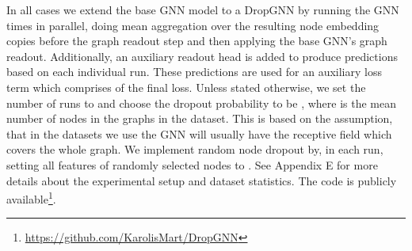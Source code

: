 \documentclass{article}
\begin{document}
In all cases we extend the base GNN model to a DropGNN by running the GNN  times in parallel, doing mean aggregation over the resulting  node embedding copies before the graph readout step and then applying the base GNN's graph readout. Additionally, an auxiliary readout head is added to produce predictions based on each individual run. These predictions are used for an auxiliary loss term which comprises  of the final loss. 
Unless stated otherwise, we set the number of runs to  and choose the dropout probability to be , where  is the mean number of nodes in the graphs in the dataset. This is based on the assumption, that in the datasets we use the GNN will usually have the receptive field which covers the whole graph. We implement random node dropout by, in each run, setting all features of randomly selected nodes to . See Appendix E for more details about the experimental setup and dataset statistics. The code is publicly available\footnote{\url{https://github.com/KarolisMart/DropGNN}}.
\end{document}
